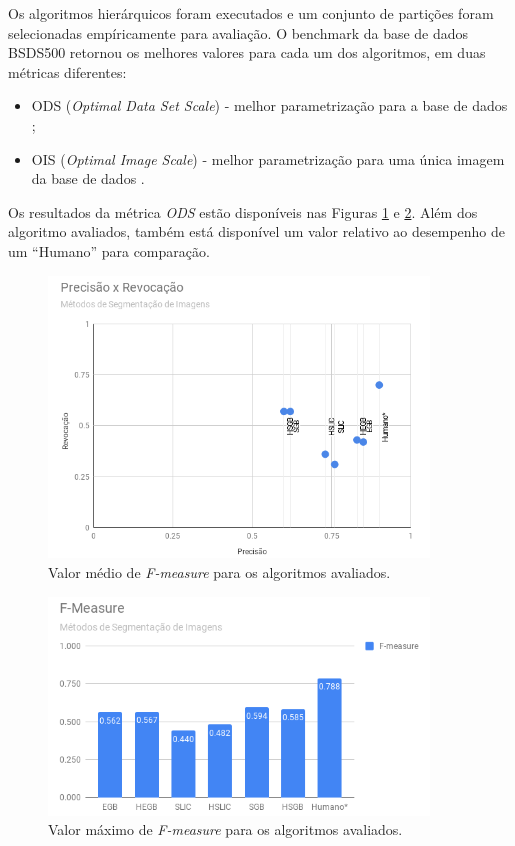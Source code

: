 \begin{document}
Os algoritmos hierárquicos foram executados e um conjunto de partições  foram selecionadas empíricamente para avaliação. O benchmark da base de dados BSDS500 retornou os melhores valores para cada um dos algoritmos, em duas métricas diferentes:

\begin{itemize}
 \item ODS (\textit{Optimal Data Set Scale}) - melhor parametrização para a base de dados \cite{CONT_EMPIRICAL};
 \item OIS (\textit{Optimal Image Scale}) - melhor parametrização para uma única imagem da base de dados \cite{CONT_EMPIRICAL}.
\end{itemize}

Os resultados da métrica \textit{ODS} estão disponíveis nas Figuras \ref{gra:PREC_RECALL} e \ref{gra:FMEASURE}. Além dos algoritmo avaliados, também está disponível um valor relativo ao desempenho de um ``Humano'' para comparação.

\begin{figure}[ht]
\centering
\includegraphics[width=0.9\textwidth]{graph_precision_recall.png}
\caption{Valor médio de \textit{F-measure} para os algoritmos avaliados.}
\label{gra:PREC_RECALL}
\end{figure}

\begin{figure}[ht]
\centering
\includegraphics[width=0.90\textwidth]{graph_fmeasure.png}
\caption{Valor máximo de \textit{F-measure} para os algoritmos avaliados.}
\label{gra:FMEASURE}
\end{figure}
\end{document}
